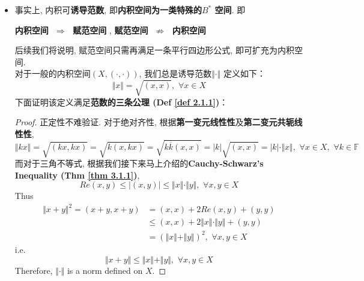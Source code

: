\begin{defn}
\begin{rmk}
\begin{itemize}
				\vspace{4em}
				
				\item 事实上, 内积可\textbf{诱导范数}, 即\textbf{内积空间为一类特殊的$B^*$ 空间}. 即
				\begin{center}
					\textbf{内积空间} $\,\, \Rightarrow \,\,$ \textbf{赋范空间} \hspace*{1em} , \hspace*{1em} \textbf{赋范空间} $\,\, \not\Rightarrow \,\,$ \textbf{内积空间}
				\end{center}
				后续我们将说明, 赋范空间只需再满足一条平行四边形公式, 即可扩充为内积空间. \\
				对于一般的内积空间$(X , (\cdot , \cdot))$, 我们总是诱导范数$\Vert \cdot \Vert$ 定义如下：
				\[ \Vert x \Vert = \sqrt{(x , x)} , \,\, \forall x \in X \]
				下面证明该定义满足\textbf{范数的三条公理 (Def \ref{def 2.1.1})}：
				
				\vspace{6em}
				
				\begin{proof}
					正定性不难验证. 对于绝对齐性, 根据\textbf{第一变元线性性}及\textbf{第二变元共轭线性性}, 
					\[ \Vert k x \Vert 
					= \sqrt{(k x , kx)} 
					= \sqrt{k(x , kx)} 
					= \sqrt{k \overline{k} (x , x)} 
					= \left| k \right| \sqrt{(x , x)} 
					= \left| k \right| \cdot \Vert x \Vert , \,\, \forall x \in X , \,\, \forall k \in \mathbb{F} \]
					而对于三角不等式, 根据我们接下来马上介绍的\textbf{Cauchy-Schwarz's Inequality (Thm \ref{thm 3.1.1})}, 
					\[ Re (x , y) \leq \Big| (x , y) \Big| \leq \Vert x \Vert \cdot \Vert y \Vert , \,\, \forall x , y \in X \]
					Thus
					\begin{align}
					\Vert x + y \Vert^2 
					= (x + y , x + y) 
					&= (x , x) + 2 Re(x , y) + (y , y) \\
					&\leq (x , x) + 2 \Vert x \Vert \cdot \Vert y \Vert + (y , y) \\
					&= \left( \Vert x \Vert + \Vert y \Vert \right)^2 , \,\, \forall x , y \in X 
					\end{align}
					i.e. 
					\[ \Vert x + y \Vert \leq \Vert x \Vert + \Vert y \Vert , \,\, \forall x , y \in X \]
					Therefore, $\Vert \cdot \Vert$ is a norm defined on $X$.
				\end{proof}
			\end{itemize}
		\end{rmk}
	\end{defn}

\newpage


